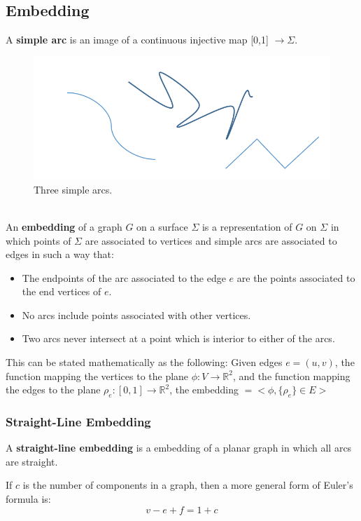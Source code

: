 \documentclass{article}
\newcommand{\R}{\mathbb{R}}
\begin{document}
  \subsection{Embedding}
  A \textbf{simple arc} is an image of a continuous injective map [0,1] $\rightarrow \Sigma$.\\
  \begin{figure}[h]
      \centering
      \includegraphics[scale=.3]{simple_arcs}       
      \caption{Three simple arcs.}
      \label{fig: Figure 3}
  \end{figure}\\
  An \textbf{embedding} of a graph $G$ on a surface $\Sigma$ is a representation of $G$ on $\Sigma$ in which points of $\Sigma$ are associated to vertices and simple arcs are associated to edges in such a way that:
  \begin{itemize}
	\item The endpoints of the arc associated to the edge $e$ are the points associated to the end vertices of $e$.
	\item No arcs include points associated with other vertices.
	\item Two arcs never intersect at a point which is interior to either of the arcs.
  \end{itemize}
  This can be stated mathematically as the following: Given edges $e=(u,v)$, the function mapping the vertices to the plane $ \phi :V \rightarrow \R^2$, and the function mapping the edges to the plane $ \rho_e :[0,1] \rightarrow \R^2$, the embedding $= <\phi, \{\rho_e\} \in E >$
  \subsubsection{Straight-Line Embedding}
  A \textbf{straight-line embedding} is a embedding of a planar graph in which all arcs are straight.


  If $c$ is the number of components in a graph, then a more general form of Euler's formula is:
  \begin{equation} 
	v-e+f= 1 + c
  \end{equation}
  
\end{document}
